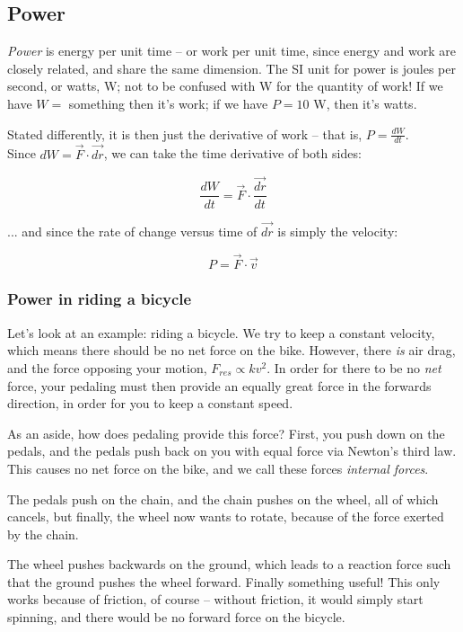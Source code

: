 \documentclass[8.01x]{subfiles}
\begin{document}
\subsection{Power}

\emph{Power} is energy per unit time -- or work per unit time, since energy and work are closely related, and share the same dimension. The SI unit for power is joules per second, or watts, W; not to be confused with W for the quantity of work! If we have $W = $ something then it's work; if we have $P = 10$ W, then it's watts.

Stated differently, it is then just the derivative of work -- that is, $P = \displaystyle \frac{dW}{dt}$.\\
Since $dW = \vec{F} \cdot \vec{dr}$, we can take the time derivative of both sides:

\begin{equation}
\frac{dW}{dt} = \vec{F} \cdot \frac{\vec{dr}}{dt}
\end{equation}

... and since the rate of change versus time of $\vec{dr}$ is simply the velocity:

\begin{equation}
P = \vec{F} \cdot \vec{v}
\end{equation}

\subsubsection{Power in riding a bicycle}

Let's look at an example: riding a bicycle. We try to keep a constant velocity, which means there should be no net force on the bike. However, there \emph{is} air drag, and the force opposing your motion, $F_{res} \propto k v^2$. In order for there to be no \emph{net} force, your pedaling must then provide an equally great force in the forwards direction, in order for you to keep a constant speed.

As an aside, how does pedaling provide this force? First, you push down on the pedals, and the pedals push back on you with equal force via Newton's third law. This causes no net force on the bike, and we call these forces \emph{internal forces}.

The pedals push on the chain, and the chain pushes on the wheel, all of which cancels, but finally, the wheel now wants to rotate, because of the force exerted by the chain.

The wheel pushes backwards on the ground, which leads to a reaction force such that the ground pushes the wheel forward. Finally something useful! This only works because of friction, of course -- without friction, it would simply start spinning, and there would be no forward force on the bicycle.
\end{document}
